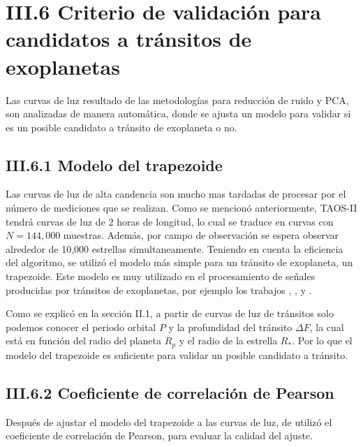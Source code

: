 \section*{III.6 Criterio de validación para candidatos a tránsitos de exoplanetas}

Las curvas de luz resultado de las metodologías para reducción de ruido y PCA, son analizadas de manera automática, donde se ajusta un modelo para validar si es un posible candidato a tránsito de exoplaneta o no.

\subsection*{III.6.1 Modelo del trapezoide}

Las curvas de luz de alta candencia son mucho mas tardadas de procesar por el número de mediciones que se realizan. Como se mencionó anteriormente, TAOS-II tendrá curvas de luz de 2 horas de longitud, lo cual se traduce en curvas con $N=144,000$ muestras. Además, por campo de observación se espera observar alrededor de 10,000 estrellas simultaneamente. Teniendo en cuenta la eficiencia del algoritmo, se utilizó el modelo más simple para un tránsito de exoplaneta, un trapezoide. Este modelo es muy utilizado en el procesamiento de señales producidas por tránsitos de exoplanetas, por ejemplo los trabajos \cite{alapini2010transiting}, \cite{hippke2019optimized}, \cite{kipping2016observational} y \cite{morton2012efficient}.


Como se explicó en la sección II.1, a partir de curvas de luz de tránsitos solo podemos conocer el periodo orbital $P$ y la profundidad del tránsito $\Delta F$, la cual está en función del radio del planeta $R_{p}$ y el radio de la estrella $R_{*}$. Por lo que el modelo del trapezoide es suficiente para validar un posible candidato a tránsito.

\subsection*{III.6.2 Coeficiente de correlación de Pearson}

Después de ajustar el modelo del trapezoide a las curvas de luz, de utilizó el coeficiente de correlación de Pearson, para evaluar la calidad del ajuste. 

